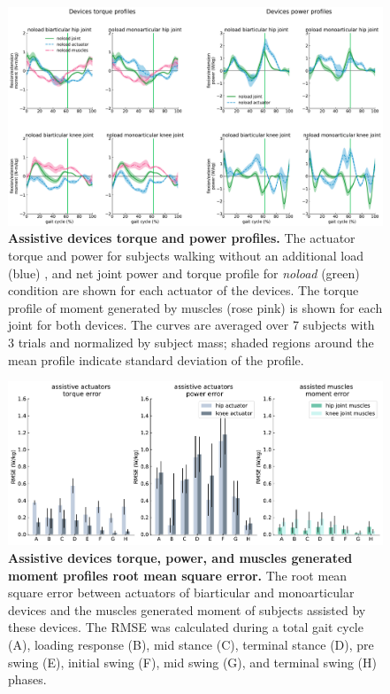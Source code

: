 \documentclass[10pt,letterpaper]{article}
\begin{document}
\begin{figure}[ht]   
	\centering
	\includegraphics[width=\linewidth]{Case_Studies/NoloadMono06_NoloadBi12/PaperFigure_Profiles.pdf}
	\vspace{1mm}
	\caption{{\small\textbf{Assistive devices torque and power profiles.} The actuator torque and power for subjects walking without an additional load (blue) , and net joint power and torque profile for \textit{noload} (green) condition are shown for each actuator of the devices. The torque profile of moment generated by muscles (rose pink) is shown for each joint for both devices. The curves are averaged over 7 subjects with 3 trials and normalized by subject mass; shaded regions around the mean profile indicate standard deviation of the profile.}}
	\label{Fig_Case02_Torque_Power_Profiles}
\end{figure}
\begin{figure}[ht]   
	\centering
	\includegraphics[width=\linewidth]{Case_Studies/NoloadMono06_NoloadBi12/RMSE.pdf}
	\vspace{1mm}
	\caption{\small{\textbf{Assistive devices torque, power, and muscles generated moment profiles root mean square error. } The root mean square error between actuators of biarticular and monoarticular devices and the muscles generated moment of subjects assisted by these devices. The RMSE was calculated during a total gait cycle (A), loading response (B), mid stance (C), terminal stance (D), pre swing (E), initial swing (F), mid swing (G), and terminal swing (H) phases.}}
	\label{Fig_Case02_RMSE}
\end{figure} 
\end{document}
